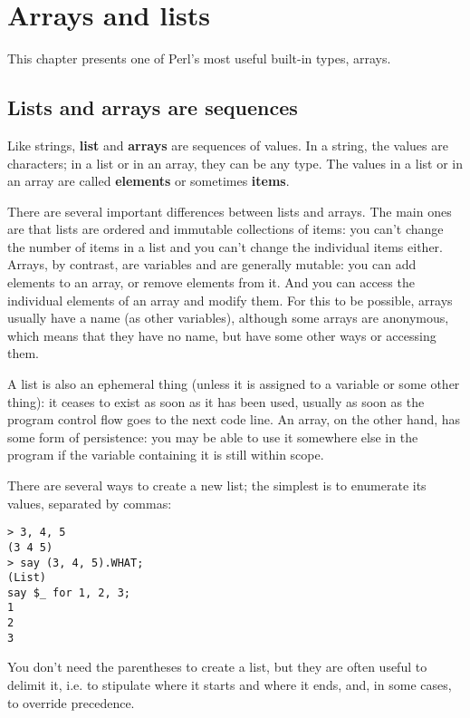 

\chapter{Arrays and lists}
\label{arrays}

This chapter presents one of Perl's most useful built-in types, 
arrays.


\section{Lists and arrays are sequences}
\label{sequence}

Like strings, {\bf list} and {\bf arrays} are sequences of 
values.  In a string, the values are characters; in a list or
in an array, they can be any type.  The values in a list or 
in an array are called {\bf elements} or sometimes {\bf items}.

There are several important differences between lists and arrays. The main ones 
are that lists are ordered and immutable collections of items: 
you can't change the number of items in a list and you can't 
change the individual items either. Arrays, by contrast, are 
variables and are generally mutable: you can add elements 
to an array, or remove elements from it. And you can access 
the individual elements of an array and modify them. For this 
to be possible, arrays usually have a name (as other variables), 
although some arrays are anonymous, which means that they 
have no name, but have some other ways or accessing them.

A list is also an ephemeral thing (unless it is assigned 
to a variable or some other thing): it ceases to exist as 
soon as it has been used, usually as soon as the program 
control flow goes to the next code line. An array, on the 
other hand, has some form of persistence: you may be able to 
use it somewhere else in the program if the variable 
containing it is still within scope.

There are several ways to create a new list; the simplest is 
to enumerate its values, separated by commas:

\begin{verbatim}
> 3, 4, 5
(3 4 5)
> say (3, 4, 5).WHAT;
(List)
say $_ for 1, 2, 3;
1
2
3
\end{verbatim}
%

You don't need the parentheses to create a list, but they are 
often useful to delimit it, i.e. to stipulate where 
it starts and where it ends, and, in some cases, to override 
precedence.

